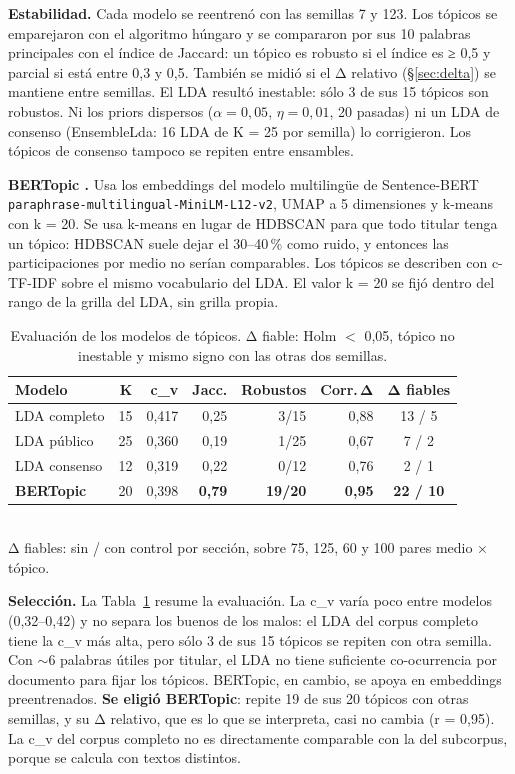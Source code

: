 \documentclass[10pt,twocolumn]{article}
\begin{document}
\textbf{Estabilidad.} Cada modelo se reentrenó con las semillas 7 y 123. Los
tópicos se emparejaron con el algoritmo húngaro y se compararon por sus 10
palabras principales con el índice de Jaccard: un tópico es robusto si el índice
es ≥ 0,5 y parcial si está entre 0,3 y 0,5. También se midió si el Δ relativo
(§\ref{sec:delta}) se mantiene entre semillas. El LDA resultó inestable: sólo 3
de sus 15 tópicos son robustos. Ni los priors dispersos ($\alpha = 0{,}05$,
$\eta = 0{,}01$, 20 pasadas) ni un LDA de consenso (EnsembleLda: 16 LDA de K = 25
por semilla) lo corrigieron. Los tópicos de consenso tampoco se repiten entre
ensambles.

\textbf{BERTopic \cite{bertopic}.} Usa los embeddings del modelo multilingüe
de Sentence-BERT \cite{reimers2019,reimers2020}
\texttt{paraphrase-\allowbreak multilingual-\allowbreak MiniLM-\allowbreak L12-v2},
UMAP a 5 dimensiones \cite{umap} y k-means con k = 20. Se usa k-means en lugar de
HDBSCAN para que todo titular tenga un tópico: HDBSCAN suele dejar el 30--40\,\%
como ruido, y entonces las participaciones por medio no serían comparables. Los
tópicos se describen con c-TF-IDF sobre el mismo vocabulario del LDA. El valor
k = 20 se fijó dentro del rango de la grilla del LDA, sin grilla propia.

\begin{table}[t]
\centering\footnotesize
\caption{Evaluación de los modelos de tópicos. Δ fiable: Holm $<$ 0,05, tópico no
inestable y mismo signo con las otras dos semillas.}
\label{tab:modelos}
\setlength{\tabcolsep}{3pt}
\begin{tabular}{lrrrrrc}\toprule
Modelo & K & c\_v & Jacc. & Robustos & Corr.\,Δ & Δ fiables\\\midrule
LDA completo & 15 & 0,417 & 0,25 & 3/15 & 0,88 & 13 / 5\\
LDA público & 25 & 0,360 & 0,19 & 1/25 & 0,67 & 7 / 2\\
LDA consenso & 12 & 0,319 & 0,22 & 0/12 & 0,76 & 2 / 1\\
\textbf{BERTopic} & 20 & 0,398 & \textbf{0,79} & \textbf{19/20} & \textbf{0,95} & \textbf{22 / 10}\\
\bottomrule\end{tabular}\\[2pt]
{\footnotesize Δ fiables: sin / con control por sección, sobre 75, 125, 60 y 100 pares medio × tópico.}
\end{table}

\textbf{Selección.} La Tabla~\ref{tab:modelos} resume la evaluación. La c\_v
varía poco entre modelos (0,32--0,42) y no separa los buenos de los malos: el LDA
del corpus completo tiene la c\_v más alta, pero sólo 3 de sus 15 tópicos se
repiten con otra semilla. Con $\sim$6 palabras útiles por titular, el LDA no tiene
suficiente co-ocurrencia por documento para fijar los tópicos. BERTopic, en
cambio, se apoya en embeddings preentrenados. \textbf{Se eligió BERTopic}: repite
19 de sus 20 tópicos con otras semillas, y su Δ relativo, que es lo que se
interpreta, casi no cambia (r = 0,95). La c\_v del corpus completo no es
directamente comparable con la del subcorpus, porque se calcula con textos
distintos.
\end{document}
